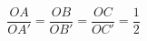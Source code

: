 \documentclass[preview]{standalone}
\begin{document}
\begin{center}
$$\frac{OA}{OA'}=\frac{OB}{OB'}=\frac{OC}{OC'}=\frac{1}{2}$$
\end{center}
\end{document}
